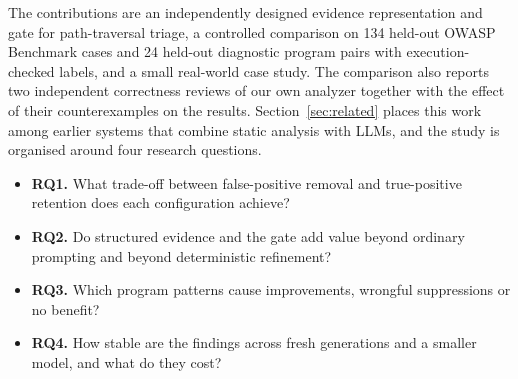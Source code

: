 The contributions are an independently designed evidence representation and gate for path-traversal triage, a controlled comparison on 134 held-out OWASP Benchmark cases and 24 held-out diagnostic program pairs with execution-checked labels, and a small real-world case study. The comparison also reports two independent correctness reviews of our own analyzer together with the effect of their counterexamples on the results. Section~\ref{sec:related} places this work among earlier systems that combine static analysis with LLMs, and the study is organised around four research questions.
\begin{itemize}
\item \textbf{RQ1.} What trade-off between false-positive removal and true-positive retention does each configuration achieve?
\item \textbf{RQ2.} Do structured evidence and the gate add value beyond ordinary prompting and beyond deterministic refinement?
\item \textbf{RQ3.} Which program patterns cause improvements, wrongful suppressions or no benefit?
\item \textbf{RQ4.} How stable are the findings across fresh generations and a smaller model, and what do they cost?
\end{itemize}
